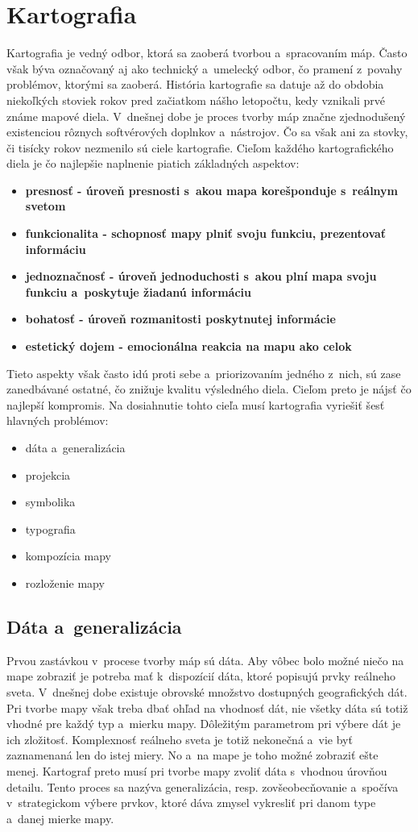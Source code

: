 \section{Kartografia}
\label{cartography}
Kartografia je vedný odbor, ktorá sa zaoberá tvorbou a~spracovaním máp. Často však býva označovaný aj ako technický a~umelecký odbor, čo pramení z~povahy problémov, ktorými sa zaoberá. História kartografie sa datuje až do obdobia niekoľkých stoviek rokov pred začiatkom nášho letopočtu, kedy vznikali prvé známe mapové diela. V~dnešnej dobe je proces tvorby máp značne zjednodušený existenciou rôznych softvérových doplnkov a~nástrojov. Čo sa však ani za stovky, či tisícky rokov nezmenilo sú ciele kartografie. Cieľom každého kartografického diela je čo najlepšie naplnenie piatich základných aspektov:
\begin{itemize}
  \item{\bf presnosť \rm - úroveň presnosti s~akou mapa korešponduje s~reálnym svetom}
  \item{\bf funkcionalita \rm - schopnosť mapy plniť svoju funkciu, prezentovať informáciu}
  \item{\bf jednoznačnosť \rm - úroveň jednoduchosti s~akou plní mapa svoju funkciu a~poskytuje žiadanú informáciu}
  \item{\bf bohatosť \rm - úroveň rozmanitosti poskytnutej informácie}
  \item{\bf estetický dojem \rm - emocionálna reakcia na mapu ako celok}
\end{itemize}
Tieto aspekty však často idú proti sebe a~priorizovaním jedného z~nich, sú zase zanedbávané ostatné, čo znižuje kvalitu výsledného diela. Cieľom preto je nájsť čo najlepší kompromis. Na dosiahnutie tohto cieľa musí kartografia vyriešiť šesť hlavných problémov:
\begin{itemize}
  \item{dáta a~generalizácia}
  \item{projekcia}
  \item{symbolika}
  \item{typografia}
  \item{kompozícia mapy}
  \item{rozloženie mapy}
\end{itemize}

\subsection*{Dáta a~generalizácia}
Prvou zastávkou v~procese tvorby máp sú dáta. Aby vôbec bolo možné niečo na mape zobraziť je potreba mať k~dispozícií dáta, ktoré popisujú prvky reálneho sveta. V~dnešnej dobe existuje obrovské množstvo dostupných geografických dát. Pri tvorbe mapy však treba dbať ohľad na vhodnosť dát, nie všetky dáta sú totiž vhodné pre každý typ a~mierku mapy. Dôležitým parametrom pri výbere dát je ich zložitosť. Komplexnosť reálneho sveta je totiž nekonečná a~vie byť zaznamenaná len do istej miery. No a~na mape je toho možné zobraziť ešte menej. Kartograf preto musí pri tvorbe mapy zvoliť dáta s~vhodnou úrovňou detailu. Tento proces sa nazýva generalizácia, resp. zovšeobecňovanie a~spočíva v~strategickom výbere prvkov, ktoré dáva zmysel vykresliť pri danom type a~danej mierke mapy.

